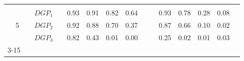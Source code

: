 \begin{table}[htbp]
{\begin{tabular}{cc|ccccccc|cccccc|}
    & & & & & & & & & & & & & & \\
    \multicolumn{2}{c|}{\multirow{3}{*}{5}} & \multicolumn{1}{l}{$DGP_{1}$} & & \multicolumn{1}{c}{0.93} & \multicolumn{1}{c}{0.91} & \multicolumn{1}{c}{0.82} & \multicolumn{1}{c}{0.64} & & & \multicolumn{1}{c}{0.93} & \multicolumn{1}{c}{0.78} & \multicolumn{1}{c}{0.28} & \multicolumn{1}{c}{0.08} & \\
    \multicolumn{2}{c|}{} & \multicolumn{1}{l}{$DGP_{2}$} & & \multicolumn{1}{c}{0.92} & \multicolumn{1}{c}{0.88} & \multicolumn{1}{c}{0.70} & \multicolumn{1}{c}{0.37} & & & \multicolumn{1}{c}{0.87} & \multicolumn{1}{c}{0.66} & \multicolumn{1}{c}{0.10} & \multicolumn{1}{c}{0.02} & \\
    \multicolumn{2}{c|}{} & \multicolumn{1}{l}{$DGP_{3}$} & & \multicolumn{1}{c}{0.82} & \multicolumn{1}{c}{0.43} & \multicolumn{1}{c}{0.01} & \multicolumn{1}{c}{0.00} & & & \multicolumn{1}{c}{0.25} & \multicolumn{1}{c}{0.02} & \multicolumn{1}{c}{0.01} & \multicolumn{1}{c}{0.03} & \\
    \cmidrule{3-15}
    \end{tabular}
  } %
\end{table}
